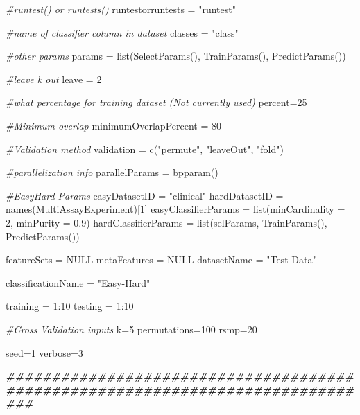 \documentclass[
]{article}
\newenvironment{Shaded}{\begin{snugshade}}{\end{snugshade}}
\newcommand{\AttributeTok}[1]{\textcolor[rgb]{0.77,0.63,0.00}{#1}}
\newcommand{\CommentTok}[1]{\textcolor[rgb]{0.56,0.35,0.01}{\textit{#1}}}
\newcommand{\ConstantTok}[1]{\textcolor[rgb]{0.00,0.00,0.00}{#1}}
\newcommand{\DecValTok}[1]{\textcolor[rgb]{0.00,0.00,0.81}{#1}}
\newcommand{\DocumentationTok}[1]{\textcolor[rgb]{0.56,0.35,0.01}{\textbf{\textit{#1}}}}
\newcommand{\FloatTok}[1]{\textcolor[rgb]{0.00,0.00,0.81}{#1}}
\newcommand{\FunctionTok}[1]{\textcolor[rgb]{0.00,0.00,0.00}{#1}}
\newcommand{\NormalTok}[1]{#1}
\newcommand{\OtherTok}[1]{\textcolor[rgb]{0.56,0.35,0.01}{#1}}
\newcommand{\SpecialCharTok}[1]{\textcolor[rgb]{0.00,0.00,0.00}{#1}}
\newcommand{\StringTok}[1]{\textcolor[rgb]{0.31,0.60,0.02}{#1}}
\begin{document}
\begin{Shaded}
\begin{Highlighting}[]
\CommentTok{\#runtest() or runtests()}
\NormalTok{runtestorruntests }\OtherTok{=} \StringTok{"runtest"}

\CommentTok{\#name of classifier column in dataset}
\NormalTok{classes }\OtherTok{=} \StringTok{"class"}

\CommentTok{\#other params}
\NormalTok{params }\OtherTok{=} \FunctionTok{list}\NormalTok{(}\FunctionTok{SelectParams}\NormalTok{(), }\FunctionTok{TrainParams}\NormalTok{(), }\FunctionTok{PredictParams}\NormalTok{())}

\CommentTok{\#leave k out}
\NormalTok{leave }\OtherTok{=} \DecValTok{2}

\CommentTok{\#what percentage for training dataset (Not currently used)}
\NormalTok{percent}\OtherTok{=}\DecValTok{25}

\CommentTok{\#Minimum overlap}
\NormalTok{minimumOverlapPercent }\OtherTok{=} \DecValTok{80}

\CommentTok{\#Validation method}
\NormalTok{validation }\OtherTok{=} \FunctionTok{c}\NormalTok{(}\StringTok{"permute"}\NormalTok{, }\StringTok{"leaveOut"}\NormalTok{, }\StringTok{"fold"}\NormalTok{)}

\CommentTok{\#parallelization info}
\NormalTok{parallelParams }\OtherTok{=} \FunctionTok{bpparam}\NormalTok{()}

\CommentTok{\#EasyHard Params}
\NormalTok{easyDatasetID }\OtherTok{=} \StringTok{"clinical"}
\NormalTok{hardDatasetID }\OtherTok{=} \FunctionTok{names}\NormalTok{(MultiAssayExperiment)[}\DecValTok{1}\NormalTok{]}
\NormalTok{easyClassifierParams }\OtherTok{=} \FunctionTok{list}\NormalTok{(}\AttributeTok{minCardinality =} \DecValTok{2}\NormalTok{, }\AttributeTok{minPurity =} \FloatTok{0.9}\NormalTok{)}
\NormalTok{hardClassifierParams }\OtherTok{=} \FunctionTok{list}\NormalTok{(selParams, }\FunctionTok{TrainParams}\NormalTok{(), }\FunctionTok{PredictParams}\NormalTok{())}
  

\NormalTok{featureSets }\OtherTok{=} \ConstantTok{NULL}
\NormalTok{metaFeatures }\OtherTok{=} \ConstantTok{NULL}
\NormalTok{datasetName }\OtherTok{=} \StringTok{"Test Data"}


\NormalTok{classificationName }\OtherTok{=} \StringTok{"Easy{-}Hard"}

\NormalTok{training }\OtherTok{=} \DecValTok{1}\SpecialCharTok{:}\DecValTok{10}
\NormalTok{testing }\OtherTok{=} \DecValTok{1}\SpecialCharTok{:}\DecValTok{10}

\CommentTok{\#Cross Validation inputs}
\NormalTok{k}\OtherTok{=}\DecValTok{5}
\NormalTok{permutations}\OtherTok{=}\DecValTok{100}
\NormalTok{rsmp}\OtherTok{=}\DecValTok{20}


\NormalTok{seed}\OtherTok{=}\DecValTok{1}
\NormalTok{verbose}\OtherTok{=}\DecValTok{3}
  
\DocumentationTok{\#\#\#\#\#\#\#\#\#\#\#\#\#\#\#\#\#\#\#\#\#\#\#\#\#\#\#\#\#\#\#\#\#\#\#\#\#\#\#\#\#\#\#\#\#\#\#\#\#\#\#\#\#\#\#\#\#\#\#\#\#\#\#\#\#\#\#\#\#\#\#\#\#\#\#\#\#\#\#}
\end{Highlighting}
\end{Shaded}
\end{document}
